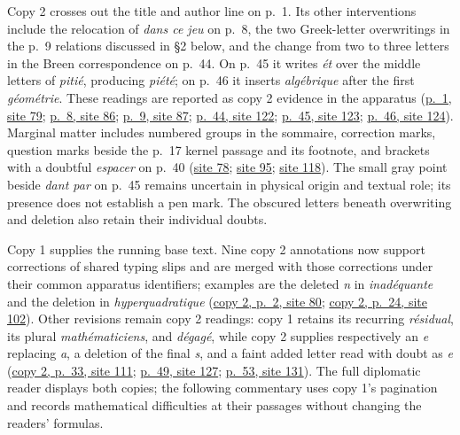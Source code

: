 \documentclass[11pt,a4paper]{article}
\begin{document}
Copy 2 crosses out the title and author line on p.~1. Its other interventions
include the relocation of \textit{dans ce jeu} on p.~8, the two Greek-letter
overwritings in the p.~9 relations discussed in \S2 below, and the change from
two to three letters in the Breen correspondence on p.~44. On p.~45 it writes
\textit{ét} over the middle letters of \textit{pitié}, producing \textit{piété};
on p.~46 it inserts \textit{algébrique} after the first \textit{géométrie}.
These readings are reported as copy 2 evidence in the apparatus
(\href{https://grothendieck.umontpellier.fr/web/viewer.html?file=../119.pdf\#page=80}{p.~1, site 79};
\href{https://grothendieck.umontpellier.fr/web/viewer.html?file=../119.pdf\#page=87}{p.~8, site 86};
\href{https://grothendieck.umontpellier.fr/web/viewer.html?file=../119.pdf\#page=88}{p.~9, site 87};
\href{https://grothendieck.umontpellier.fr/web/viewer.html?file=../119.pdf\#page=123}{p.~44, site 122};
\href{https://grothendieck.umontpellier.fr/web/viewer.html?file=../119.pdf\#page=124}{p.~45, site 123};
\href{https://grothendieck.umontpellier.fr/web/viewer.html?file=../119.pdf\#page=125}{p.~46, site 124}).
Marginal matter includes numbered groups in the sommaire, correction marks,
question marks beside the p.~17 kernel passage and its footnote, and brackets
with a doubtful \textit{espacer} on p.~40
(\href{https://grothendieck.umontpellier.fr/web/viewer.html?file=../119.pdf\#page=79}{site 78};
\href{https://grothendieck.umontpellier.fr/web/viewer.html?file=../119.pdf\#page=96}{site 95};
\href{https://grothendieck.umontpellier.fr/web/viewer.html?file=../119.pdf\#page=119}{site 118}).
The small gray point beside \textit{dant par} on p.~45 remains uncertain in
physical origin and textual role; its presence does not establish a pen mark.
The obscured letters beneath overwriting and deletion also retain their
individual doubts.

Copy 1 supplies the running base text. Nine copy 2 annotations now support
corrections of shared typing slips and are merged with those corrections under
their common apparatus identifiers; examples are the deleted \textit{n} in
\textit{inadéquante} and the deletion in \textit{hyperquadratique}
(\href{https://grothendieck.umontpellier.fr/web/viewer.html?file=../119.pdf\#page=81}{copy 2, p.~2, site 80};
\href{https://grothendieck.umontpellier.fr/web/viewer.html?file=../119.pdf\#page=103}{copy 2, p.~24, site 102}).
Other revisions remain copy 2 readings: copy 1 retains its recurring
\textit{résidual}, its plural \textit{mathématiciens}, and
\textit{dégagé}, while copy 2 supplies respectively an \textit{e} replacing
\textit{a}, a deletion of the final \textit{s}, and a faint added letter read
with doubt as \textit{e}
(\href{https://grothendieck.umontpellier.fr/web/viewer.html?file=../119.pdf\#page=112}{copy 2, p.~33, site 111};
\href{https://grothendieck.umontpellier.fr/web/viewer.html?file=../119.pdf\#page=128}{p.~49, site 127};
\href{https://grothendieck.umontpellier.fr/web/viewer.html?file=../119.pdf\#page=132}{p.~53, site 131}).
The full diplomatic reader displays both copies; the following commentary
uses copy 1's pagination and records mathematical difficulties at their
passages without changing the readers' formulas.
\end{document}
